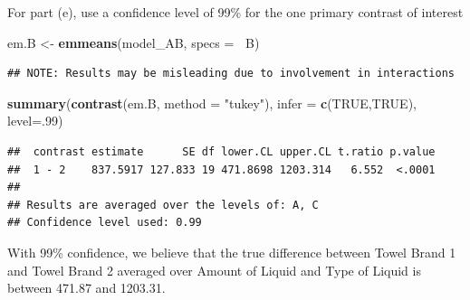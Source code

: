 \documentclass[12pt,]{article}
\newenvironment{Shaded}{\begin{snugshade}}{\end{snugshade}}
\newcommand{\KeywordTok}[1]{\textcolor[rgb]{0.13,0.29,0.53}{\textbf{#1}}}
\newcommand{\DataTypeTok}[1]{\textcolor[rgb]{0.13,0.29,0.53}{#1}}
\newcommand{\DecValTok}[1]{\textcolor[rgb]{0.00,0.00,0.81}{#1}}
\newcommand{\StringTok}[1]{\textcolor[rgb]{0.31,0.60,0.02}{#1}}
\newcommand{\OtherTok}[1]{\textcolor[rgb]{0.56,0.35,0.01}{#1}}
\newcommand{\OperatorTok}[1]{\textcolor[rgb]{0.81,0.36,0.00}{\textbf{#1}}}
\newcommand{\NormalTok}[1]{#1}
\begin{document}
For part (e), use a confidence level of 99\% for the one primary
contrast of interest

\begin{Shaded}
\begin{Highlighting}[]
\NormalTok{em.B <-}\StringTok{ }\KeywordTok{emmeans}\NormalTok{(model_AB, }\DataTypeTok{specs =} \OperatorTok{~}\NormalTok{B)}
\end{Highlighting}
\end{Shaded}

\begin{verbatim}
## NOTE: Results may be misleading due to involvement in interactions
\end{verbatim}

\begin{Shaded}
\begin{Highlighting}[]
\KeywordTok{summary}\NormalTok{(}\KeywordTok{contrast}\NormalTok{(em.B, }\DataTypeTok{method =} \StringTok{"tukey"}\NormalTok{), }\DataTypeTok{infer =} \KeywordTok{c}\NormalTok{(}\OtherTok{TRUE}\NormalTok{,}\OtherTok{TRUE}\NormalTok{), }\DataTypeTok{level=}\NormalTok{.}\DecValTok{99}\NormalTok{)}
\end{Highlighting}
\end{Shaded}

\begin{verbatim}
##  contrast estimate      SE df lower.CL upper.CL t.ratio p.value
##  1 - 2    837.5917 127.833 19 471.8698 1203.314   6.552  <.0001
## 
## Results are averaged over the levels of: A, C 
## Confidence level used: 0.99
\end{verbatim}

With 99\% confidence, we believe that the true difference between Towel
Brand 1 and Towel Brand 2 averaged over Amount of Liquid and Type of
Liquid is between 471.87 and 1203.31.
\end{document}
